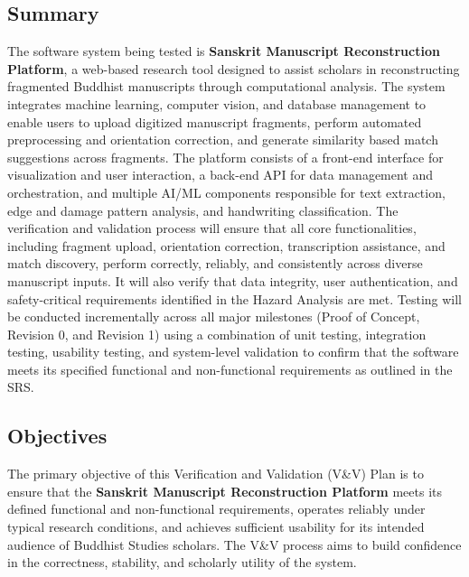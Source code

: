 \documentclass[12pt, titlepage]{article}
\begin{document}
\subsection{Summary}
The software system being tested is \textbf{Sanskrit Manuscript Reconstruction Platform}, a web-based research tool designed to assist scholars in reconstructing fragmented Buddhist manuscripts through computational analysis. The system integrates machine learning, computer vision, and database management to enable users to upload digitized manuscript fragments, perform automated preprocessing and orientation correction, and generate similarity based match suggestions across fragments. 
\newline
The platform consists of a front-end interface for visualization and user interaction, a back-end API for data management and orchestration, and multiple AI/ML components responsible for text extraction, edge and damage pattern analysis, and handwriting classification.  
\newline
The verification and validation process will ensure that all core functionalities, including fragment upload, orientation correction, transcription assistance, and match discovery, perform correctly, reliably, and consistently across diverse manuscript inputs. It will also verify that data integrity, user authentication, and safety-critical requirements identified in the Hazard Analysis are met. 
\newline
Testing will be conducted incrementally across all major milestones (Proof of Concept, Revision 0, and Revision 1) using a combination of unit testing, integration testing, usability testing, and system-level validation to confirm that the software meets its specified functional and non-functional requirements as outlined in the SRS.
  
\subsection{Objectives}

The primary objective of this Verification and Validation (V\&V) Plan is to ensure that the \textbf{Sanskrit Manuscript Reconstruction Platform} meets its defined functional and non-functional requirements, operates reliably under typical research conditions, and achieves sufficient usability for its intended audience of Buddhist Studies scholars. The V\&V process aims to build confidence in the correctness, stability, and scholarly utility of the system.
\end{document}
